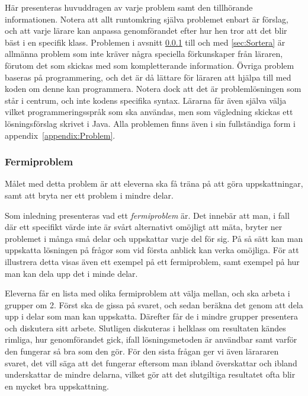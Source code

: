 \textcolor{lila}{Här presenteras huvuddragen av varje problem samt den tillhörande informationen. Notera att allt runtomkring själva problemet enbart är förslag, och att varje lärare kan anpassa genomförandet efter hur hen tror att det blir bäst i en specifik klass. Problemen i avsnitt \ref{sec:Fermi} till och med \ref{sec:Sortera} är allmänna problem som inte kräver några speciella förkunskaper från läraren, förutom det som skickas med som kompletterande information. Övriga problem baseras på programmering, och det är då lättare för läraren att hjälpa till med koden om denne kan programmera. Notera dock att det är problemlösningen som står i centrum, och inte kodens specifika syntax. Lärarna får även själva välja vilket programmeringsspråk som ska användas, men som vägledning skickas ett lösningsförslag skrivet i Java. Alla problemen finns även i sin fullständiga form i appendix~\ref{appendix:Problem}.}

\subsubsection{Fermiproblem}
    \label{sec:Fermi}
 
    \textcolor{lila}{Målet med detta problem är att eleverna ska få träna på att göra uppskattningar, samt att bryta ner ett problem i mindre delar.}
    
    \textcolor{lila}{Som inledning presenteras vad ett \textsl{fermiproblem} är. Det innebär att man, i fall där ett specifikt värde inte är svårt alternativt omöjligt att mäta, bryter ner problemet i många små delar och uppskattar varje del för sig. På så sätt kan man uppskatta lösningen på frågor som vid första anblick kan verka omöjliga. För att illustrera detta visas även ett exempel på ett fermiproblem, samt exempel på hur man kan dela upp det i minde delar.}

    \textcolor{lila}{Eleverna får en lista med olika fermiproblem att välja mellan, och ska arbeta i grupper om 2. Först ska de gissa på svaret, och sedan beräkna det genom att dela upp i delar som man kan uppskatta. Därefter får de i mindre grupper presentera och diskutera sitt arbete. Slutligen diskuteras i helklass om resultaten kändes rimliga, hur genomförandet gick, ifall lösningsmetoden är användbar samt varför den fungerar så bra som den gör. För den sista frågan ger vi även lärararen svaret, det vill säga att det fungerar eftersom man ibland överskattar och ibland underskattar de mindre delarna, vilket gör att det slutgiltiga resultatet ofta blir en mycket bra uppskattning.}

